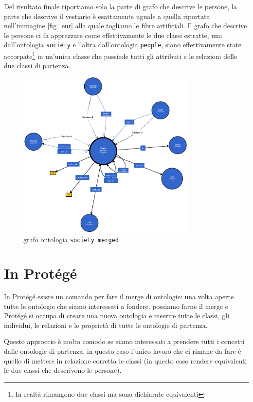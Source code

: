 Del risultato finale riportiamo solo la parte di grafo che descrive le persone, la parte che descrive il vestiario è esattamente uguale a quella riportata nell'immagine \ref{fig_eur} alla quale togliamo le fibre artificiali. Il grafo che descrive le persone ci fa apprezzare come effettivamente le due classi estratte, una dall'ontologia \verb|society| e l'altra dall'ontologia \verb|people|, siano effettivamente state accorpate\footnote{In realtà rimangono due classi ma sono dichiarate equivalenti} in un'unica classe che possiede tutti gli attributi e le relazioni delle due classi di partenza.
\begin{figure}[H]
	\centering
	\includegraphics[width=0.8\textwidth]{Picture/society_merged.rdf.pdf}
	\caption{grafo ontologia \texttt{society merged}}
\end{figure}

\section{In Protégé}
In Protégé esiste un comando per fare il merge di ontologie: una volta aperte tutte le ontologie che siamo interessati a fondere, possiamo farne il merge e Protégé si occupa di creare una nuova ontologia e inserire tutte le classi, gli individui, le relazioni e le proprietà di tutte le ontologie di partenza. 

Questo approccio è molto comodo se siamo interessati a prendere tutti i concetti dalle ontologie di partenza, in questo caso l'unico lavoro che ci rimane da fare è quello di mettere in relazione corretta le classi (in questo caso rendere equivalenti le due classi che descrivono le persone). 

